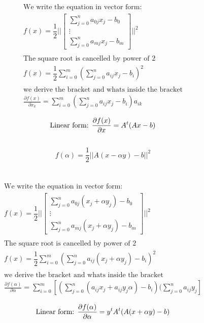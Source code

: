 \documentclass[12pt]{article}         %
\begin{document}
$$
\begin{aligned}
\text{We write the equation in vector form:}\\
f(x) = \dfrac{1}{2}||
  \begin{bmatrix}
 \sum_{j=0}^{n}a_{0j}x_j - b_0\\
\vdots\\
  \sum_{j=0}^{n}a_{mj}x_j - b_m
   \end{bmatrix}
||^2\\\\
\text{The square root is cancelled by power of 2}\\
f(x) = \dfrac{1}{2}\sum_{i=0}^{m}(\sum_{j=0}^{n}a_{ij}x_j - b_i)^2\\\\
\text{we derive the bracket and whats inside the bracket}\\
\frac {\partial f(x)}{\partial x_k} = \sum_{i=0}^{m}(\sum_{j=0}^{n}a_{ij}x_j - b_i)a_{ik}\\
\end{aligned}
$$
$$
\text{Linear form: }\\
	\frac {\partial f(x)}{\partial x}  = A^t(Ax - b)
$$\\
\begin{equation}
	f(\alpha) = \dfrac{1}{2}||A(x - \alpha y) - b||^2
\end{equation}
\\
\\
$$
\begin{aligned}
\text{We write the equation in vector form:}\\
f(x) = \dfrac{1}{2}||
  \begin{bmatrix}
 \sum_{j=0}^{n}a_{0j}(x_j + \alpha y_j) - b_0\\
\vdots\\
  \sum_{j=0}^{n}a_{mj}(x_j + \alpha y_j) - b_m
   \end{bmatrix}
||^2\\\\
\text{The square root is cancelled by power of 2}\\
f(x) = \dfrac{1}{2}\sum_{i=0}^{m}(\sum_{j=0}^{n}a_{ij}(x_j + \alpha y_j) - b_i)^2\\\\
\text{we derive the bracket and whats inside the bracket}\\
\frac {\partial f(\alpha)}{\partial \alpha} = \sum_{i=0}^{m}[ ( \sum_{j=0}^{n}(a_{ij}x_j +a_{ij}y_j\alpha) - b_i)(\sum_{j=0}^{n}a_{ij}y_j]\\
\end{aligned}
$$
$$
\text{Linear form: }\\
	\frac {\partial f(\alpha)}{\partial \alpha} = y^tA^t(A(x +\alpha y) - b)
$$\\
\end{document}
